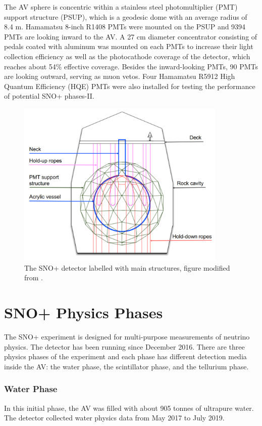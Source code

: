 The AV sphere is concentric within a stainless steel photomultiplier (PMT) support structure (PSUP), which is a geodesic dome with an average radius of 8.4 m. Hamamatsu 8-inch R1408 PMTs were mounted on the PSUP and 9394 PMTs are looking inward to the AV. A 27 cm diameter concentrator consisting of pedals coated with aluminum was mounted on each PMTs to increase their light collection efficiency as well as the photocathode coverage of the detector, which reaches about 54\% effective coverage. Besides the inward-looking PMTs, 90 PMTs are looking outward, serving as muon vetos.  Four Hamamatsu R5912 High Quantum Efficiency (HQE) PMTs were also installed for testing the performance of potential SNO+ phases-II\cite{stringer2019sensitivity}. 

\begin{figure}[htbp]
	\centering
	\includegraphics[width=10cm]{SNOPdetector.png}
	\caption{The SNO+ detector labelled with main structures, figure modified from \cite{jones2011background}.}
	\label{snopdetector}
\end{figure}

\section{SNO+ Physics Phases}
The SNO+ experiment is designed for multi-purpose measurements of neutrino physics. The detector has been running since December 2016. There are three physics phases of the experiment and each phase has different detection media inside the AV: the water phase, the scintillator phase, and the tellurium phase\cite{whitepaper}. 

\subsubsection{Water Phase} 
In this initial phase, the AV was filled with about 905 tonnes of ultrapure water. The detector collected water physics data from May 2017 to July 2019.

